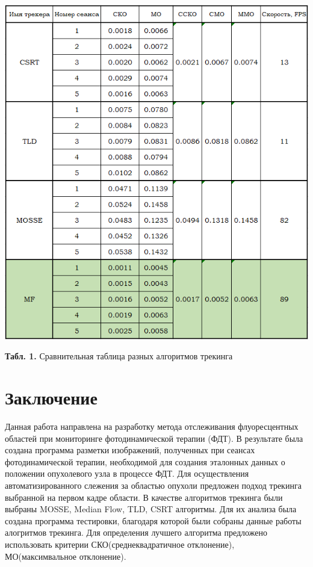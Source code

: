 \documentclass[a4paper,14pt]{extarticle}
\begin{document}
\begin{center}
    \includegraphics[scale = 1.2]{tab.png}
    
    
    \textbf{Табл. 1.} Сравнительная таблица разных алгоритмов трекинга
\end{center}



\newpage
\section{Заключение}
Данная работа направлена на разработку метода отслеживания флуоресцентных областей при мониторинге фотодинамической терапии (ФДТ). В результате была создана программа разметки изображений, полученных при сеансах фотодинамической терапии, необходимой для создания эталонных данных о положении опухолевого узла в процессе ФДТ. Для осуществления автоматизированного слежения за областью опухоли предложен подход трекинга выбранной на первом кадре области. В качестве алгоритмов трекинга были выбраны MOSSE, Median Flow, TLD, CSRT алгоритмы. Для их анализа была создана программа тестировки, благодаря которой были собраны данные работы алогритмов трекинга. Для определения лучшего алгоритма предложено использовать критерии СКО(среднеквадратичное отклонение), МО(максимвальное отклонение).
\end{document}
